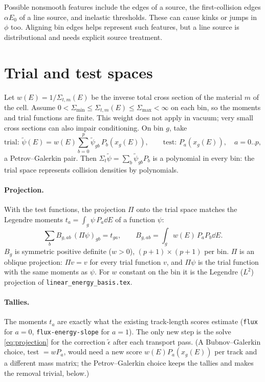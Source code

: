 \documentclass[11pt]{article}
\newcommand{\tpsi}{\tilde\psi}
\newcommand{\teps}{\tilde\epsilon}
\newcommand{\Sigt}{\Sigma_t}
\begin{document}
Possible nonsmooth features include the edges of a source, the
first-collision edges $\alpha E_0$ of a line source, and inelastic thresholds. These
can cause kinks or jumps in $\phi$ too. Aligning bin edges helps represent such
features, but a line source is distributional and needs explicit source treatment.

\section{Trial and test spaces}

Let $w(E) = 1/\Sigma_{t,m}(E)$ be the inverse total cross section of the material $m$
of the cell. Assume $0<\Sigma_{\min}\le\Sigma_{t,m}(E)\le\Sigma_{\max}<\infty$
on each bin, so the moments and trial functions are finite. This weight does not
apply in vacuum; very small cross sections can also impair conditioning.
On bin $g$, take
\begin{equation}
  \text{trial: } \tpsi(E) = w(E)\sum_{b=0}^{p}\tpsi_{gb}\,P_b(x_g(E)),\qquad
  \text{test: } P_a(x_g(E)),\quad a = 0..p,
\end{equation}
a Petrov--Galerkin pair. Then $\Sigt\tpsi = \sum_b \tpsi_{gb}P_b$ is a polynomial in
every bin: the trial space represents collision densities by polynomials.

\paragraph{Projection.} With the test functions, the projection $\Pi$ onto the trial
space matches the Legendre moments $t_a = \int_g\psi\,P_a\dd E$ of a function $\psi$:
\begin{equation}
  \sum_b B_{g,ab}\,(\Pi\psi)_{gb} = t_{ga},\qquad
  B_{g,ab} = \int_g w(E)\,P_aP_b\dd E .
  \label{eq:projection}
\end{equation}
$B_g$ is symmetric positive definite ($w>0$), $(p+1)\times(p+1)$ per bin. $\Pi$ is an
oblique projection: $\Pi v = v$ for every trial function $v$, and $\Pi\psi$ is the trial
function with the same moments as $\psi$. For $w$ constant on the bin it is the
Legendre ($L^2$) projection of \texttt{linear\_energy\_basis.tex}.

\paragraph{Tallies.} The moments $t_a$ are exactly what the existing track-length scores
estimate (\texttt{flux} for $a=0$, \texttt{flux-energy-slope} for $a=1$). The only new
step is the solve \eqref{eq:projection} for the correction $\teps$ after each transport
pass. (A Bubnov--Galerkin choice, test $= wP_a$, would need a new score
$w(E)P_a(x_g(E))$ per track and a different mass matrix; the Petrov--Galerkin choice
keeps the tallies and makes the removal trivial, below.)
\end{document}
